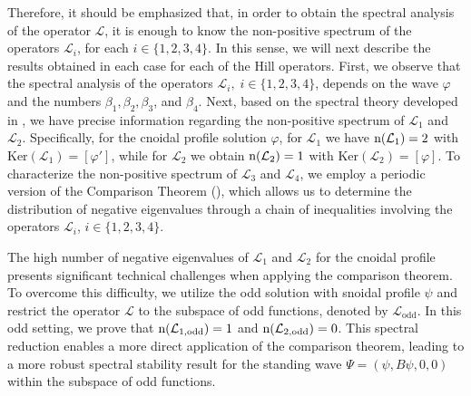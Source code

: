 \documentclass[10pt,reqno,a4paper]{amsart} %
\theoremstyle{definition} %
\numberwithin{equation}{section}
\numberwithin{figure}{section}
\begin{document}
Therefore, it should be emphasized that, in order to obtain the spectral analysis of the operator $\mathcal{L}$, it is enough to know the non-positive spectrum of the operators $\mathcal{L}_i$, for each $i \in \{1,2,3,4\}$. In this sense, we will next describe the results obtained in each case for each of the Hill operators. First, we observe that the spectral analysis of the operators $\mathcal{L}_i,\; i \in \{1,2,3,4\}$, depends on the wave $\varphi$ and the numbers $\beta_1, \beta_2, \beta_3$, and $\beta_4$. Next, based on the spectral theory developed in \cite{BittencourtLoreno2022}, we have precise information regarding the non-positive spectrum of $\mathcal{L}_1$ and $\mathcal{L}_2$. Specifically, for the cnoidal profile solution $\varphi$, for $\mathcal{L}_1$ we have  ${\rm n}(\mathcal{L}_1) = 2$ with $\text{Ker}(\mathcal{L}_1) = [\varphi']$, while for $\mathcal{L}_2$ we obtain ${\rm n}(\mathcal{L}_2) = 1$ with $\text{Ker}(\mathcal{L}_2) = [\varphi]$. To characterize the non-positive spectrum of $\mathcal{L}_3$ and $\mathcal{L}_4$, we employ a periodic version of the Comparison Theorem (\cite[Theorem 2.2.2]{Eastham}), which allows us to determine the distribution of negative eigenvalues through a chain of inequalities involving the operators $\mathcal{L}_i$, $i \in \{1,2,3,4\}$.

The high number of negative eigenvalues of $\mathcal{L}_1$ and $\mathcal{L}_2$ for the cnoidal profile presents significant technical challenges when applying the comparison theorem. To overcome this difficulty, we utilize the odd solution with snoidal profile $\psi$ and restrict the operator $\mathcal{L}$ to the subspace of odd functions, denoted by $\mathcal{L}_{\text{odd}}$. In this odd setting, we prove that ${\rm n}(\mathcal{L}_{1,\text{odd}}) = 1$ and ${\rm n}(\mathcal{L}_{2,\text{odd}}) = 0$. This spectral reduction enables a more direct application of the comparison theorem, leading to a more robust spectral stability result for the standing wave $\Psi = (\psi, B\psi,0,0)$ within the subspace of odd functions.
\end{document}
